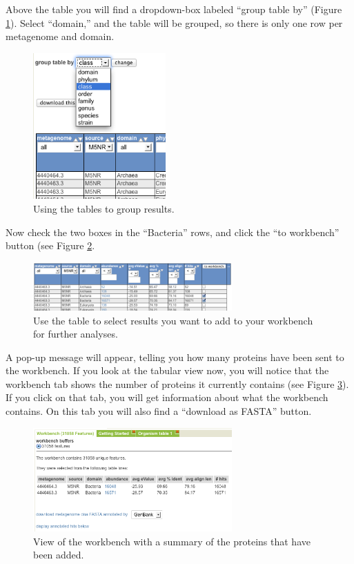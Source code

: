 \documentclass[12pt,fullpage]{report}
\begin{document}
Above the table you will find a dropdown-box labeled ``group table by'' (Figure \ref{fig:table-group-by-class}). Select ``domain,'' and the table will be grouped, so there is only one row per metagenome and domain.
\begin{figure}[ht]
\begin{center}
\includegraphics[width=2in]{Images/table-group-by-class.png}
\end{center}
\caption{
Using the tables to group results.
}
\label{fig:table-group-by-class}
\end{figure}

Now check the two boxes in the ``Bacteria'' rows, and click the ``to workbench'' button (see Figure \ref{fig:table-organism-abundance}.

\begin{figure}
\begin{center}
\includegraphics[width=3in]{Images/table-organism-abundance.png}
\end{center}
\caption{
Use the table to select results you want to add to your workbench for further analyses.
}
\label{fig:table-organism-abundance}
\end{figure}

A pop-up message will appear, telling you how many proteins have been sent to the workbench. If you look at the tabular view now, you will notice that the workbench tab shows the number of proteins it currently contains (see Figure \ref{fig:workbench}). If you click on that tab, you will get information about what the workbench contains. On this tab you will also find a ``download as FASTA'' button.

\begin{figure}
\begin{center}
\includegraphics[width=3in]{Images/workbench.png}
\end{center}
\caption{
View of the workbench with a summary of the proteins that have been added.
}
\label{fig:workbench}
\end{figure}
\end{document}
